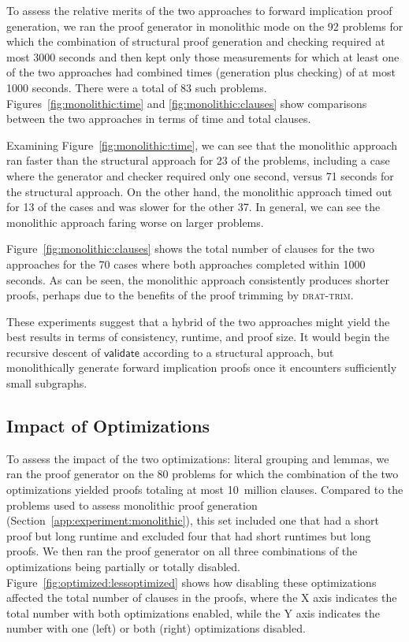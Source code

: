 \documentclass[letterpaper,USenglish,cleveref, autoref, thm-restate]{lipics-v2021}
\newcommand{\validate}{\textsf{validate}}
\newcommand{\progname}[1]{\textsc{#1}}
\newcommand{\dtrim}{\progname{drat-trim}}
\begin{document}





To assess the relative merits of the two approaches to forward
implication proof generation, we ran the proof generator in monolithic
mode on the 92 problems for which the combination of structural proof generation
and checking required at most 3000 seconds and then kept only those
measurements for which at least one of the two approaches had combined
times (generation plus checking) of at most 1000 seconds.  There were
a total of 83 such problems.  Figures~\ref{fig:monolithic:time} and
\ref{fig:monolithic:clauses} show comparisons between the two
approaches in terms of time and total clauses.

Examining Figure~\ref{fig:monolithic:time}, we can see that the
monolithic approach ran faster than the structural approach for 23 of
the problems, including a case where the generator and checker
required only one second, versus 71 seconds for the structural
approach.  On the other hand, the monolithic approach timed out for 13
of the cases and was slower for the other 37.  In general, we can see
the monolithic approach faring worse on larger problems.

Figure~\ref{fig:monolithic:clauses} shows the total number of clauses
for the two approaches for the 70 cases where both approaches completed within 1000 seconds.
As can be seen, the monolithic approach consistently produces
shorter proofs, perhaps due to the benefits of the proof trimming by
\dtrim{}.

These experiments suggest that a hybrid of the two approaches might
yield the best results in terms of consistency, runtime, and proof
size.  It would begin the recursive descent of $\validate$ according
to a structural approach, but monolithically generate forward
implication proofs once it encounters sufficiently small subgraphs.


\subsection{Impact of Optimizations}
\label{app:experiment:optimize}



To assess the impact of the two optimizations: literal grouping and
lemmas, we ran the proof generator on the 80 problems for which the
combination of the two optimizations yielded proofs totaling at most
10~million clauses.  Compared to the problems used to assess monolithic
proof generation (Section~\ref{app:experiment:monolithic}), this set included one that had a short proof but
long runtime and excluded four that had short runtimes but long
proofs.  We then ran the proof generator on all three combinations of
the optimizations being partially or totally disabled.
Figure~\ref{fig:optimized:lessoptimized} shows how disabling these optimizations affected the
total number of clauses in the proofs, where the X axis indicates the
total number with both optimizations enabled, while the Y axis
indicates the number with one (left) or both (right) optimizations
disabled.
\end{document}
